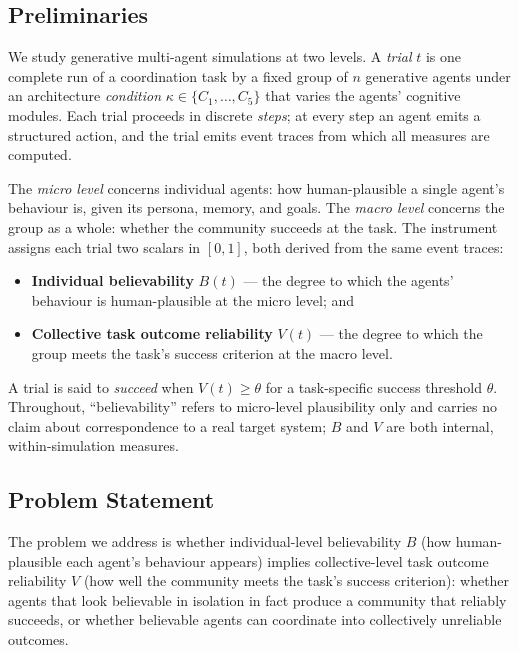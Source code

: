 \documentclass[runningheads]{llncs}
\begin{document}
\subsection{Preliminaries}\label{sec:prelim}
We study generative multi-agent simulations at two levels. A \emph{trial} $t$ is one
complete run of a coordination task by a fixed group of $n$ generative agents under an
architecture \emph{condition} $\kappa\in\{C_1,\dots,C_5\}$ that varies the agents' cognitive
modules. Each trial proceeds in discrete \emph{steps}; at every step an agent emits a
structured action, and the trial emits event traces from which all measures are computed.

The \emph{micro level} concerns individual agents: how human-plausible a single agent's
behaviour is, given its persona, memory, and goals. The \emph{macro level} concerns the group
as a whole: whether the community succeeds at the task. The instrument assigns each trial two
scalars in $[0,1]$, both derived from the same event traces:
\begin{itemize}
  \item \textbf{Individual believability} $B(t)$ --- the degree to which the agents'
  behaviour is human-plausible at the micro level; and
  \item \textbf{Collective task outcome reliability} $V(t)$ --- the degree to which the group
  meets the task's success criterion at the macro level.
\end{itemize}
A trial is said to \emph{succeed} when $V(t)\geq\theta$ for a task-specific success threshold
$\theta$. Throughout, ``believability'' refers to micro-level plausibility only and carries
no claim about correspondence to a real target system; $B$ and $V$ are both internal,
within-simulation measures.

\subsection{Problem Statement}\label{sec:problem}
The problem we address is whether individual-level believability $B$ (how human-plausible each
agent's behaviour appears) implies collective-level task outcome reliability $V$ (how well the
community meets the task's success criterion): whether agents that look believable in isolation
in fact produce a community that reliably succeeds, or whether believable agents can coordinate
into collectively unreliable outcomes.
\end{document}
